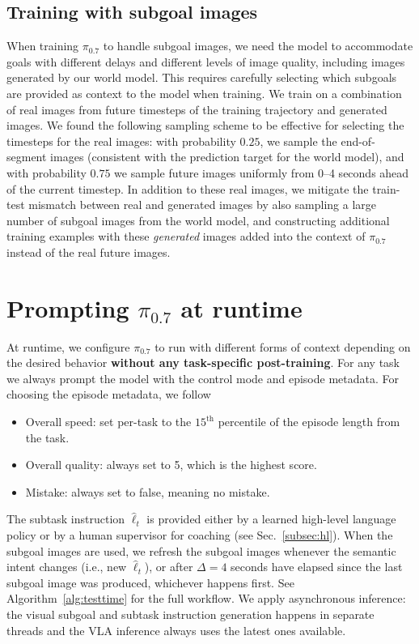\documentclass[conference]{IEEEtran}
\newcommand{\rawtext}{\hat{\ell}} %
\def \MethodName {$\pi_{0.7}$}
\begin{document}
\subsection{Training with subgoal images} 
When training \MethodName{} to handle subgoal images, we need the model to accommodate goals with different delays and different levels of image quality, including images generated by our world model. This requires carefully selecting which subgoals are provided as context to the model when training. We train on a combination of real images from future timesteps of the training trajectory and generated images. We found the following sampling scheme to be effective for selecting the timesteps for the real images:
with probability $0.25$, we sample the end-of-segment images (consistent with the prediction target for the world model), and with probability $0.75$ we sample future images uniformly from 0--4 seconds ahead of the current timestep. In addition to these real images, we mitigate the train-test mismatch between real and generated images by also sampling a large number of subgoal images from the world model, and constructing additional training examples with these \emph{generated} images added into the context of \MethodName{} instead of the real future images.








\section{Prompting \texorpdfstring{\MethodName{}}{pi0.7} at runtime}
\label{sec:runtime}

At runtime, we configure \MethodName{} to run with different forms of context depending on the desired behavior \textbf{without any task-specific post-training}. For any task we always prompt the model with the control mode and episode metadata. 
For choosing the episode metadata, we follow
\begin{itemize}[leftmargin=10pt]
    \item Overall speed: set per-task to the $15^\text{th}$ percentile of the episode length from the task.
    \item Overall quality: always set to 5, which is the highest score.
    \item Mistake: always set to false, meaning no mistake.
\end{itemize}
The subtask instruction $\rawtext_t$ is provided either by a learned high-level language policy or by a human supervisor for coaching (see Sec.~\ref{subsec:hl}).
When the subgoal images are used, we refresh the subgoal images whenever the semantic intent changes (i.e., new $\rawtext_t$), or after $\Delta=4$ seconds have elapsed since the last subgoal image was produced, whichever happens first. See Algorithm~\ref{alg:testtime} for the full workflow. We apply asynchronous inference: the visual subgoal and subtask instruction generation happens in separate threads and the VLA inference always uses the latest ones available.
\end{document}
